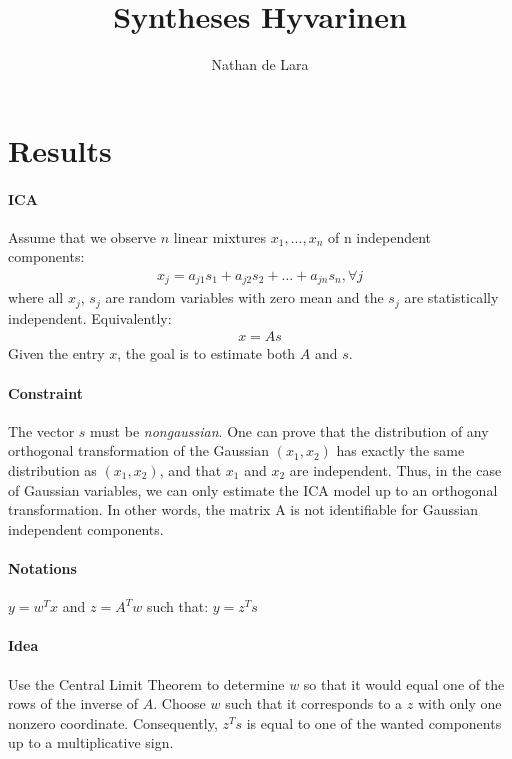 \documentclass[a4paper,twoside,10pt]{article}
\begin{document}
\pagestyle{empty} %

\title{Syntheses Hyvarinen}

\author{Nathan de Lara}
\maketitle

\section{Results}
\paragraph{ICA}
Assume that we observe $n$ linear mixtures $x_1, ...,x_n$ of n independent components:
\begin{align*}
x_j = a_{j1}s_1+a_{j2}s_2+...+a_{jn}s_n, \forall j
\end{align*}
where all $x_j$, $s_j$ are random variables with zero mean and the $s_j$ are statistically independent. Equivalently:
\begin{align*}
x = As
\end{align*}
Given the entry $x$, the goal is to estimate both $A$ and $s$.

\paragraph{Constraint} The vector $s$ must be \textit{nongaussian}. One can prove that the distribution of any orthogonal transformation of the Gaussian $(x_1,x_2)$
has exactly the same distribution as $(x_1,x_2)$, and that $x_1$ and $x_2$ are independent. Thus, in the case of Gaussian variables, we can only estimate the ICA model up to an orthogonal transformation. In other words, the matrix A is not identifiable for Gaussian independent components.

\paragraph{Notations} $y = w^Tx$ and $z=A^Tw$ such that: $y = z^Ts$

\paragraph{Idea} Use the Central Limit Theorem to determine $w$ so that it would
equal one of the rows of the inverse of $A$. Choose $w$ such that it corresponds to a $z$ with only one nonzero coordinate. Consequently, $z^Ts$ is equal to one of the wanted components up to a multiplicative sign.
\end{document}
